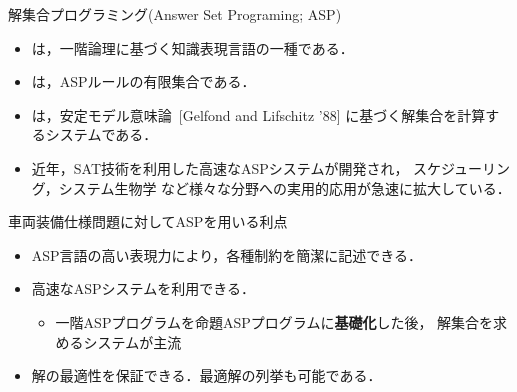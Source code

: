 \documentclass[dvipdfmx, 11pt,]{beamer}
\begin{document}
\begin{frame}{解集合プログラミング(Answer Set Programing; ASP)}
 \begin{itemize}
 \item {}は，一階論理に基づく知識表現言語の一種である．
 \item {}は，ASPルールの有限集合である．
 \item {}は，安定モデル意味論~[Gelfond and Lifschitz '88]
   に基づく解集合を計算するシステムである．
 \item 近年，SAT技術を利用した高速なASPシステムが開発され，
   スケジューリング，システム生物学
   など様々な分野への実用的応用が急速に拡大している．
 \end{itemize}
\vfill
 \begin{alertblock}{車両装備仕様問題に対してASPを用いる利点}
   \begin{itemize} 
   \item ASP言語の高い表現力により，各種制約を簡潔に記述できる．
   \item 高速なASPシステムを利用できる．
     \begin{itemize}
     \item 一階ASPプログラムを命題ASPプログラムに\alert{\bf 基礎化}した後，
       解集合を求めるシステムが主流
     \end{itemize}
   \item 解の最適性を保証できる．最適解の列挙も可能である．
   \end{itemize}
 \end{alertblock}
\end{frame}
\end{document}
